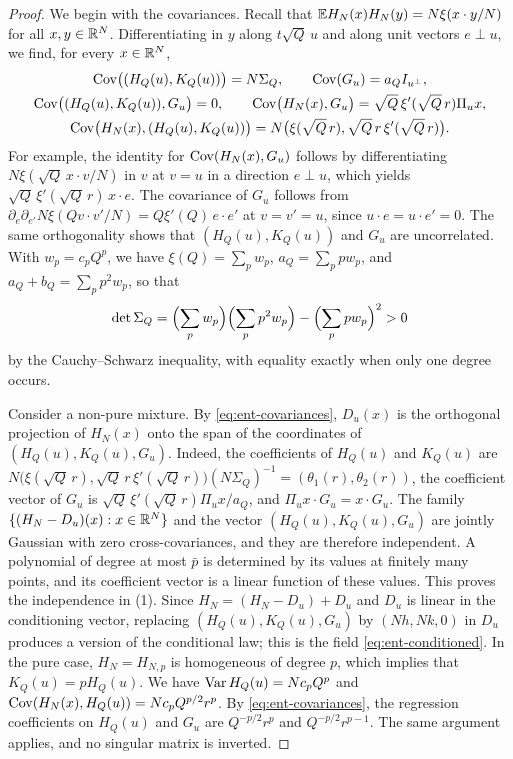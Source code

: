 \begin{proof}
We begin with the covariances. Recall that
$\mathbb E H_N(x)H_N(y)=N\xi(x\cdot y/N)$ for all $x,y\in\mathbb R^N$. Differentiating in
$y$ along $t\sqrt Q\,u$ and along unit vectors $e\perp u$, we find, for
every $x\in\mathbb R^N$,
\begin{equation}\label{eq:ent-covariances}
 \begin{gathered}
 \operatorname{Cov}\bigl((H_Q(u),K_Q(u))\bigr)=N\Sigma_Q,\qquad
 \operatorname{Cov}(G_u)=a_QI_{u^\perp},\\
 \operatorname{Cov}\bigl((H_Q(u),K_Q(u)),G_u\bigr)=0,\qquad
 \operatorname{Cov}\bigl(H_N(x),G_u\bigr)=\sqrt Q\,\xi'(\sqrt Q\,r)\Pi_ux,\\
 \operatorname{Cov}\bigl(H_N(x),(H_Q(u),K_Q(u))\bigr)
   =N\bigl(\xi(\sqrt Q\,r),\sqrt Q\,r\,\xi'(\sqrt Q\,r)\bigr).
 \end{gathered}
\end{equation}
For example, the identity for $\operatorname{Cov}(H_N(x),G_u)$ follows by
differentiating $N\xi(\sqrt Q\,x\cdot v/N)$ in $v$ at $v=u$ in a direction
$e\perp u$, which yields $\sqrt Q\,\xi'(\sqrt Q\,r)\,x\cdot e$. The covariance of $G_u$ follows
from $\partial_e\partial_{e'}N\xi(Qv\cdot v'/N)=Q\xi'(Q)\,e\cdot e'$ at
$v=v'=u$, since $u\cdot e=u\cdot e'=0$. The same orthogonality shows that
$(H_Q(u),K_Q(u))$ and $G_u$ are uncorrelated. With $w_p=c_pQ^p$, we have
$\xi(Q)=\sum_pw_p$, $a_Q=\sum_ppw_p$, and $a_Q+b_Q=\sum_pp^2w_p$, so that
\[
 \det\Sigma_Q=\Bigl(\sum_pw_p\Bigr)\Bigl(\sum_pp^2w_p\Bigr)
 -\Bigl(\sum_ppw_p\Bigr)^2>0
\]
by the Cauchy--Schwarz inequality, with equality exactly when only one degree
occurs.

Consider a non-pure mixture. By \eqref{eq:ent-covariances}, $D_u(x)$ is the
orthogonal projection of $H_N(x)$ onto the span of the coordinates of
$(H_Q(u),K_Q(u),G_u)$. Indeed, the coefficients of $H_Q(u)$ and $K_Q(u)$
are $N\bigl(\xi(\sqrt Q\,r),\sqrt Q\,r\,\xi'(\sqrt Q\,r)\bigr)(N\Sigma_Q)^{-1}
=(\theta_1(r),\theta_2(r))$, the coefficient vector of $G_u$ is
$\sqrt Q\,\xi'(\sqrt Q\,r)\Pi_ux/a_Q$, and $\Pi_ux\cdot G_u=x\cdot
G_u$. The family $\{(H_N-D_u)(x):x\in\mathbb R^N\}$ and the vector
$(H_Q(u),K_Q(u),G_u)$ are jointly Gaussian with zero cross-covariances, and
they are therefore independent. A polynomial of degree at most $\bar p$ is
determined by its values at finitely many points, and its coefficient vector
is a linear function of these values. This proves the independence in
(1). Since
$H_N=(H_N-D_u)+D_u$ and $D_u$ is linear in the conditioning vector, replacing
$(H_Q(u),K_Q(u),G_u)$ by $(Nh,Nk,0)$ in $D_u$ produces a version of the
conditional law; this is the field \eqref{eq:ent-conditioned}. In the pure
case, $H_N=H_{N,p}$ is homogeneous of degree $p$, which implies that
$K_Q(u)=pH_Q(u)$. We have $\operatorname{Var} H_Q(u)=Nc_pQ^p$ and
$\operatorname{Cov}(H_N(x),H_Q(u))=Nc_pQ^{p/2}r^p$. By \eqref{eq:ent-covariances}, the
regression coefficients on $H_Q(u)$ and $G_u$ are $Q^{-p/2}r^p$ and
$Q^{-p/2}r^{p-1}$. The same argument applies, and no singular matrix is
inverted.


\end{proof}
